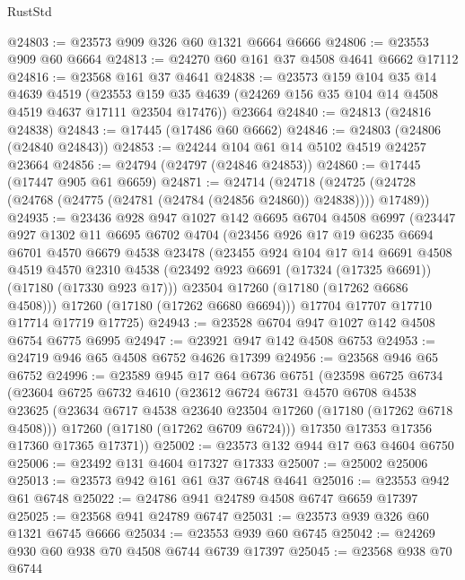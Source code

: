 \begin{lexlean}{RustStd}
\begin{coremodule}
{\begin{coremodule}
{{{{{{{{{{{{{{{{{{{{{{{{{{{{{{{{{{{{{{{{{{{{{{{{{{{{{{{@24803 := @23573 @909 @326 @60 @1321 @6664 @6666
@24806 := @23553 @909 @60 @6664
@24813 := @24270 @60 @161 @37 @4508 @4641 @6662 @17112
@24816 := @23568 @161 @37 @4641
@24838 := @23573
    @159
    @104
    @35
    @14
    @4639
    @4519
    (@23553 @159 @35 @4639 (@24269 @156 @35 @104 @14 @4508 @4519 @4637 @17111 @23504 @17476))
    @23664
@24840 := @24813 (@24816 @24838)
@24843 := @17445 (@17486 @60 @6662)
@24846 := @24803 (@24806 (@24840 @24843))
@24853 := @24244 @104 @61 @14 @5102 @4519 @24257 @23664
@24856 := @24794 (@24797 (@24846 @24853))
@24860 := @17445 (@17447 @905 @61 @6659)
@24871 := @24714
    (@24718 (@24725 (@24728 (@24768 (@24775 (@24781 (@24784 (@24856 @24860)) @24838)))) @17489))
@24935 := @23436
    @928
    @947
    @1027
    @142
    @6695
    @6704
    @4508
    @6997
    (@23447
      @927
      @1302
      @11
      @6695
      @6702
      @4704
      (@23456
        @926
        @17
        @19
        @6235
        @6694
        @6701
        @4570
        @6679
        @4538
        @23478
        (@23455
          @924
          @104
          @17
          @14
          @6691
          @4508
          @4519
          @4570
          @2310
          @4538
          (@23492 @923 @6691 (@17324 (@17325 @6691)) (@17180 (@17330 @923 @17)))
          @23504
          @17260
          (@17180 (@17262 @6686 @4508)))
        @17260
        (@17180 (@17262 @6680 @6694)))
      @17704
      @17707
      @17710
      @17714
      @17719
      @17725)
@24943 := @23528 @6704 @947 @1027 @142 @4508 @6754 @6775 @6995
@24947 := @23921 @947 @142 @4508 @6753
@24953 := @24719 @946 @65 @4508 @6752 @4626 @17399
@24956 := @23568 @946 @65 @6752
@24996 := @23589
    @945
    @17
    @64
    @6736
    @6751
    (@23598
      @6725
      @6734
      (@23604
        @6725
        @6732
        @4610
        (@23612
          @6724
          @6731
          @4570
          @6708
          @4538
          @23625
          (@23634 @6717 @4538 @23640 @23504 @17260 (@17180 (@17262 @6718 @4508)))
          @17260
          (@17180 (@17262 @6709 @6724)))
        @17350
        @17353
        @17356
        @17360
        @17365
        @17371))
@25002 := @23573 @132 @944 @17 @63 @4604 @6750
@25006 := @23492 @131 @4604 @17327 @17333
@25007 := @25002 @25006
@25013 := @23573 @942 @161 @61 @37 @6748 @4641
@25016 := @23553 @942 @61 @6748
@25022 := @24786 @941 @24789 @4508 @6747 @6659 @17397
@25025 := @23568 @941 @24789 @6747
@25031 := @23573 @939 @326 @60 @1321 @6745 @6666
@25034 := @23553 @939 @60 @6745
@25042 := @24269 @930 @60 @938 @70 @4508 @6744 @6739 @17397
@25045 := @23568 @938 @70 @6744
}}}}}}}}}}}}}}}}}}}}}}}}}}}}}}}}}}}}}}}}}}}}}}}}}}}}}}}
\end{coremodule}}
\end{coremodule}
\end{lexlean}
